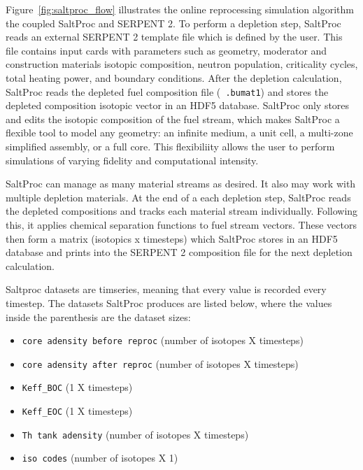 Figure~\ref{fig:saltproc_flow} illustrates the  online reprocessing simulation algorithm the 
coupled SaltProc and SERPENT 2. To perform a depletion step,
SaltProc reads an external SERPENT 2 template file which is defined by the user. This file 
contains input cards with parameters such as geometry,
moderator and construction materials isotopic composition, neutron population, criticality 
cycles, total heating power, and boundary conditions.
After the depletion calculation, SaltProc reads the depleted fuel composition file (\texttt{
.bumat1}) and stores the depleted
composition isotopic vector in an HDF5 database. SaltProc only stores and edits the isotopic 
composition of the fuel stream,
which makes SaltProc a flexible tool to model any geometry: an infinite medium, a unit cell, a 
multi-zone simplified assembly, or a full core.
This flexibiliity allows the user to perform simulations of varying fidelity and computational 
intensity.

SaltProc can manage as many material streams as desired. It also may work with multiple depletion 
materials. At the end of a each depletion
step, SaltProc reads the depleted compositions and tracks each material stream individually. 
Following this, it applies chemical
separation functions to fuel stream vectors. These vectors then form a matrix (isotopics x 
timesteps) which SaltProc stores in an HDF5 database
and prints into the SERPENT 2 composition file for the next depletion calculation.

Saltproc datasets are timseries, meaning that every value is recorded every timestep. The 
datasets SaltProc produces are listed below,
where the values inside the parenthesis are the dataset sizes:

\begin{itemize}
    \item \texttt{core adensity before reproc} (number of isotopes X timesteps)
    \item \texttt{core adensity after reproc} (number of isotopes X timesteps)
    \item \texttt{Keff_BOC} (1 X timesteps)
    \item \texttt{Keff_EOC} (1 X timesteps)
    \item \texttt{Th tank adensity} (number of isotopes X timesteps)
    \item \texttt{iso codes} (number of isotopes X 1)
\end{itemize}

